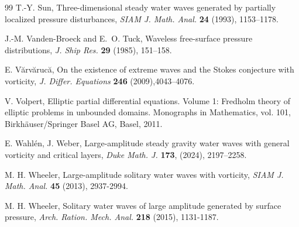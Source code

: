 \documentclass[12pt,letterpaper]{amsart}
\numberwithin{equation}{section}
\begin{document}
\begin{thebibliography}{99}
T.-Y. Sun,
Three-dimensional steady water waves generated by partially localized pressure
disturbances,
\emph{SIAM J. Math. Anal.} \textbf{24} (1993), 1153--1178.


J.-M. Vanden-Broeck and E.~O. Tuck,
Waveless free-surface pressure distributions,
\emph{J. Ship Res.} \textbf{29} (1985), 151--158.

 E. V\u arv\u aruc\u a, On the existence of extreme waves and the {Stokes} conjecture with vorticity, \emph{J. Differ. Equations} \textbf{246} (2009),4043--4076.

 V. Volpert, Elliptic partial differential equations. {V}olume 1:
{F}redholm theory of elliptic problems in unbounded domains. Monographs in Mathematics, vol. 101, Birkh\"auser/Springer Basel AG, Basel, 2011.

E. Wahl{\'e}n, J. Weber, Large-amplitude steady gravity water waves with general vorticity and critical layers, \emph{Duke Math. J.} \textbf{173}, (2024), 2197--2258.

 M. H. Wheeler, Large-amplitude solitary water waves with vorticity,
\emph{SIAM J. Math. Anal.} \textbf{45} (2013), 2937-2994.

 M. H. Wheeler, Solitary water waves of large amplitude generated by surface
pressure, \emph{Arch. Ration. Mech. Anal.} \textbf{218} (2015), 1131-1187.




\end{thebibliography}
\end{document}
